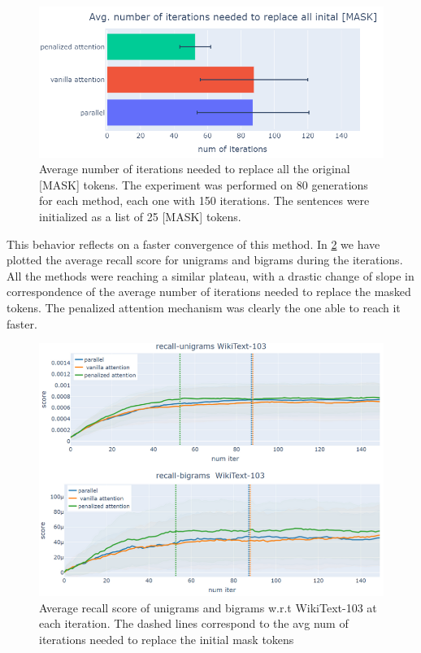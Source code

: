 \documentclass[10pt,twocolumn,letterpaper]{article}
\begin{document}
\begin{figure}[t!]
   \centering
   \includegraphics[width =\linewidth]{newplot (21).png}
   \caption{Average number of iterations needed to replace all the original [MASK] tokens.
   The experiment was performed on 80 generations for each method, each one with 150 iterations.
   The sentences were initialized as a list of 25 [MASK] tokens.}
   \label{fig:ReplaceMask}
\end{figure}

This behavior reflects on a faster convergence of this method.
In \ref{fig:Recall} we have plotted the average recall score for unigrams and bigrams during the iterations.
All the methods were reaching a similar plateau, with a drastic change of slope in correspondence of the
average number of iterations needed to replace the masked tokens. The penalized attention mechanism was clearly the
one able to reach it faster.

\begin{figure}[t!]
   \centering
   \includegraphics[width=\linewidth]{recall.png}
   \caption{Average recall score of unigrams and bigrams w.r.t WikiText-103
   at each iteration. The dashed lines correspond to the avg num of iterations needed
   to replace the initial mask tokens}
   \label{fig:Recall}
\end{figure}
\end{document}
